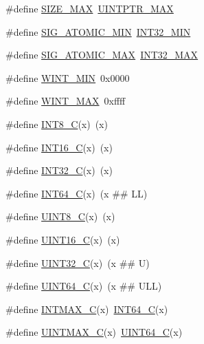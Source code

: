 \begin{DoxyCompactItemize}
\#define \hyperlink{stdint_8h_a3c75bb398badb69c7577b21486f9963f}{S\-I\-Z\-E\-\_\-\-M\-A\-X}~\hyperlink{stdint_8h_ab2355300ea19395357e62d780f4dd073}{U\-I\-N\-T\-P\-T\-R\-\_\-\-M\-A\-X}
\item 
\#define \hyperlink{stdint_8h_a21e605b9ac3a03b6de93cdf5a69e129f}{S\-I\-G\-\_\-\-A\-T\-O\-M\-I\-C\-\_\-\-M\-I\-N}~\hyperlink{stdint_8h_a688eb21a22db27c2b2bd5836943cdcbe}{I\-N\-T32\-\_\-\-M\-I\-N}
\item 
\#define \hyperlink{stdint_8h_a1f5fe9445d0ad0bee21bab1de4cc3e58}{S\-I\-G\-\_\-\-A\-T\-O\-M\-I\-C\-\_\-\-M\-A\-X}~\hyperlink{stdint_8h_a181807730d4a375f848ba139813ce04f}{I\-N\-T32\-\_\-\-M\-A\-X}
\item 
\#define \hyperlink{stdint_8h_a5285bc55170ae1701e599decacc7f001}{W\-I\-N\-T\-\_\-\-M\-I\-N}~0x0000
\item 
\#define \hyperlink{stdint_8h_ad3f7b6bb8aa7d619017a91d3b2edc1ee}{W\-I\-N\-T\-\_\-\-M\-A\-X}~0xffff
\item 
\#define \hyperlink{stdint_8h_a1eaa7db37089dcdfb60227725c9c1585}{I\-N\-T8\-\_\-\-C}(x)~(x)
\item 
\#define \hyperlink{stdint_8h_a838b261fec725cb0f5d5b6769d3521e7}{I\-N\-T16\-\_\-\-C}(x)~(x)
\item 
\#define \hyperlink{stdint_8h_ad78650fb7726f4e99205406569ef403d}{I\-N\-T32\-\_\-\-C}(x)~(x)
\item 
\#define \hyperlink{stdint_8h_a93d102802b35d3b8abae9bbe7f0fed75}{I\-N\-T64\-\_\-\-C}(x)~(x \#\# L\-L)
\item 
\#define \hyperlink{stdint_8h_acd2aa09844a8a245cf7fdbb808e215e5}{U\-I\-N\-T8\-\_\-\-C}(x)~(x)
\item 
\#define \hyperlink{stdint_8h_a1cb39a2cfaf899fd38730c7637807708}{U\-I\-N\-T16\-\_\-\-C}(x)~(x)
\item 
\#define \hyperlink{stdint_8h_a2451a7ede7ebd810357f1503e9898ea6}{U\-I\-N\-T32\-\_\-\-C}(x)~(x \#\# U)
\item 
\#define \hyperlink{stdint_8h_a134ae84400d184ed2570e3270d5472c2}{U\-I\-N\-T64\-\_\-\-C}(x)~(x \#\# U\-L\-L)
\item 
\#define \hyperlink{stdint_8h_a846429736de0233f6ecddedb21424ddd}{I\-N\-T\-M\-A\-X\-\_\-\-C}(x)~\hyperlink{stdint_8h_a93d102802b35d3b8abae9bbe7f0fed75}{I\-N\-T64\-\_\-\-C}(x)
\item 
\#define \hyperlink{stdint_8h_ad99c338b32fbeaa158cba21e532dfe5d}{U\-I\-N\-T\-M\-A\-X\-\_\-\-C}(x)~\hyperlink{stdint_8h_a134ae84400d184ed2570e3270d5472c2}{U\-I\-N\-T64\-\_\-\-C}(x)
\end{DoxyCompactItemize}

